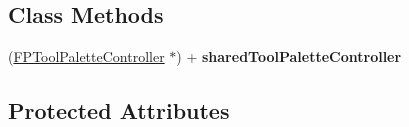 \subsection*{Class Methods}
\begin{DoxyCompactItemize}
\item 
\mbox{\label{interface_f_p_tool_palette_controller_a96040b48ddb3f45a4b50822a1f7162f9}} 
(\mbox{\hyperlink{interface_f_p_tool_palette_controller}{F\+P\+Tool\+Palette\+Controller}} $\ast$) + {\bfseries shared\+Tool\+Palette\+Controller}
\end{DoxyCompactItemize}
\subsection*{Protected Attributes}
